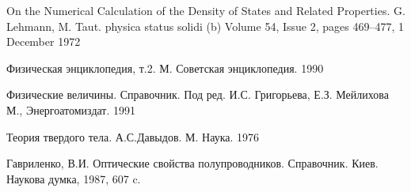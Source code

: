 \begin{thebibliography}{99}
On the Numerical Calculation of the Density of States and Related Properties. G. Lehmann, M. Taut. physica status solidi (b)
Volume 54, Issue 2, pages 469–477, 1 December 1972

 Физическая энциклопедия, т.2. М. Советская
энциклопедия. 1990

 Физические величины. Справочник. Под ред.
И.С. Григорьева, Е.З. Мейлихова М., Энергоатомиздат. 1991

 Теория твердого тела. А.С.Давыдов. М. Наука. 1976

Гавриленко, В.И. Оптические свойства полупроводников. Справочник. Киев. Наукова думка, 1987, 607 c.








\end{thebibliography}
